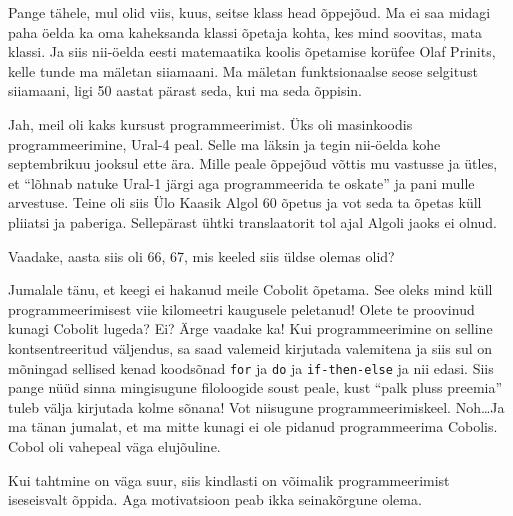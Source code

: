 Pange tähele, mul olid viis, kuus, seitse klass head õppejõud. Ma ei saa midagi paha öelda ka oma kaheksanda klassi õpetaja kohta, kes mind soovitas, mata klassi. Ja siis nii-öelda eesti matemaatika koolis õpetamise korüfee Olaf Prinits, kelle tunde ma mäletan siiamaani. Ma mäletan funktsionaalse seose selgitust siiamaani, ligi 50 aastat pärast seda, kui ma seda õppisin. 


Jah, meil oli kaks kursust programmeerimist. Üks oli masinkoodis programmeerimine, Ural-4 peal. Selle ma läksin ja tegin nii-öelda kohe septembrikuu jooksul ette ära. Mille peale õppejõud võttis mu vastusse ja ütles, et \enquote{lõhnab natuke Ural-1 järgi aga programmeerida te oskate} ja pani mulle arvestuse. Teine oli siis Ülo Kaasik Algol 60 õpetus ja vot seda ta õpetas küll pliiatsi ja paberiga. Sellepärast ühtki translaatorit tol ajal Algoli jaoks ei olnud. 


Vaadake, aasta siis oli 66, 67, mis keeled siis  üldse olemas olid? 

Jumalale tänu, et keegi ei hakanud meile Cobolit õpetama. See oleks mind küll programmeerimisest viie kilomeetri kaugusele peletanud! Olete te proovinud kunagi Cobolit lugeda? Ei? Ärge vaadake ka! Kui programmeerimine on selline kontsentreeritud väljendus, sa saad valemeid kirjutada valemitena ja siis sul on mõningad sellised kenad koodsõnad \verb|for| ja \verb|do| ja \verb|if-then-else| ja nii edasi. Siis pange nüüd sinna mingisugune filoloogide soust peale, kust \enquote{palk pluss preemia}  tuleb välja kirjutada kolme sõnana! Vot niisugune programmeerimiskeel. Noh\ldots Ja ma tänan jumalat, et ma mitte kunagi ei ole pidanud programmeerima Cobolis. Cobol oli vahepeal väga elujõuline. 


Kui tahtmine on väga suur, siis kindlasti on võimalik programmeerimist iseseisvalt õppida. Aga  motivatsioon peab ikka seinakõrgune olema. 


